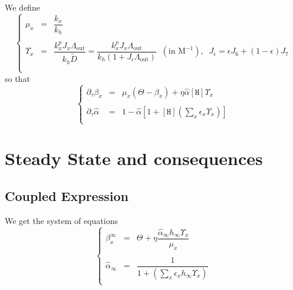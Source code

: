 \documentclass[aps,onecolumn,12pt]{revtex4}
\newcommand{\mychem}[1]{\mathtt{#1}}
\newcommand{\myconc}[1]{\left\lbrack{#1}\right\rbrack}
\newcommand{\spproton}{\mychem{H}}
\newcommand{\proton}{\myconc{\spproton}}
\newcommand{\LiAll}{\Lambda}
\newcommand{\LiAllOut}{{\LiAll}_{\mathrm{out}}}
\begin{document}
We define 
\begin{equation}
\left\lbrace
\begin{array}{rcl}
	\mu_x      & = & \dfrac{k_x}{k_h}\\
	\\
	\Upsilon_x & = & \dfrac{k_x^pJ_x \LiAllOut}{k_h \tilde{D}}
	 = \dfrac{k_x^pJ_x \LiAllOut}{k_h\left(1+ J_\epsilon\LiAllOut\right)} \;\; (\text{in M}^{-1}),\;\; J_\epsilon= \epsilon J_6 + (1-\epsilon) J_7\\
	 \\
\end{array}
\right.
\end{equation}
so that
\begin{equation}
\left\lbrace
\begin{array}{rcl}
\partial_\tau \beta_x  & = &  \mu_x \left(\Theta -\beta_x \right) + \eta \hat\alpha \proton \Upsilon_x \\
\\
	\partial_\tau \hat\alpha & = & 1 - 
		\hat\alpha \left\lbrack 1+ \proton \left(\sum_x \epsilon_x \Upsilon_x \right)\right] \\
\end{array}
\right.
\end{equation}

\section{Steady State and consequences}
\subsection{Coupled Expression}
We get the system of equations
\begin{equation}
\left\lbrace
\begin{array}{rcl}
	\beta_x^\infty & = & %
		\Theta + \eta \dfrac{\hat\alpha_\infty h_\infty \Upsilon_x}{\mu_x}\\
	\\
	\hat\alpha_\infty & = & \dfrac{1%
	}{1 + \left(\sum_x \epsilon_x h_\infty \Upsilon_x \right) %
	}\\
\end{array}
\right.
\end{equation}
\end{document}
